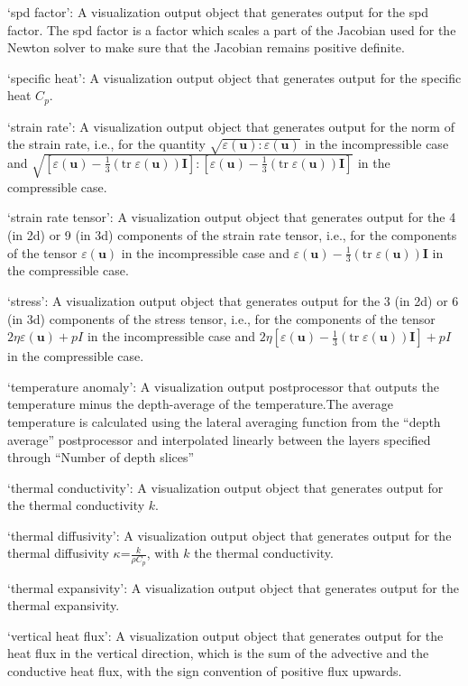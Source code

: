 \begin{itemize}
`spd factor': A visualization output object that generates output for the spd factor. The spd factor is a factor which scales a part of the Jacobian used for the Newton solver to make sure that the Jacobian remains positive definite.

`specific heat': A visualization output object that generates output for the specific heat $C_p$.

`strain rate': A visualization output object that generates output for the norm of the strain rate, i.e., for the quantity $\sqrt{\varepsilon(\mathbf u):\varepsilon(\mathbf u)}$ in the incompressible case and $\sqrt{[\varepsilon(\mathbf u)-\tfrac 13(\textrm{tr}\;\varepsilon(\mathbf u))\mathbf I]:[\varepsilon(\mathbf u)-\tfrac 13(\textrm{tr}\;\varepsilon(\mathbf u))\mathbf I]}$ in the compressible case.

`strain rate tensor': A visualization output object that generates output for the 4 (in 2d) or 9 (in 3d) components of the strain rate tensor, i.e., for the components of the tensor $\varepsilon(\mathbf u)$ in the incompressible case and $\varepsilon(\mathbf u)-\tfrac 13(\textrm{tr}\;\varepsilon(\mathbf u))\mathbf I$ in the compressible case.

`stress': A visualization output object that generates output for the 3 (in 2d) or 6 (in 3d) components of the stress tensor, i.e., for the components of the tensor $2\eta\varepsilon(\mathbf u)+pI$ in the incompressible case and $2\eta\left[\varepsilon(\mathbf u)-\tfrac 13(\textrm{tr}\;\varepsilon(\mathbf u))\mathbf I\right]+pI$ in the compressible case.

`temperature anomaly': A visualization output postprocessor that outputs the temperature minus the depth-average of the temperature.The average temperature is calculated using the lateral averaging function from the ``depth average'' postprocessor and interpolated linearly between the layers specified through ``Number of depth slices''

`thermal conductivity': A visualization output object that generates output for the thermal conductivity $k$.

`thermal diffusivity': A visualization output object that generates output for the thermal diffusivity $\kappa$=$\frac{k}{\rho C_p}$, with $k$ the thermal conductivity.

`thermal expansivity': A visualization output object that generates output for the thermal expansivity.

`vertical heat flux': A visualization output object that generates output for the heat flux in the vertical direction, which is the sum of the advective and the conductive heat flux, with the sign convention of positive flux upwards.


\end{itemize}
